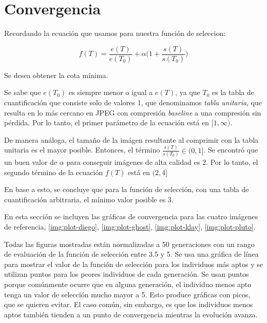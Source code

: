 \section{Convergencia}

Recordando la ecuación que usamos para nuestra función de seleccion:

\begin{equation}
f(T) = \frac{e(T)}{e(T_0)} + \alpha \Big(1 + \frac{s(T)}{s(T_0)}\Big)
\end{equation}\label{eq:fitness-repeated}

Se desea obtener la cota mínima.

Se sabe que $e(T_0)$ es siempre menor o igual a $e(T)$, ya que $T_0$ es la
tabla de cuantificación que consiste solo de valores 1, que denominamos
\emph{tabla unitaria}, que resulta en lo más cercano en JPEG con compresión
\emph{baseline} a una compresión sin pérdida. Por lo tanto, el primer parámetro
de la ecuación está en $[1, \infty)$.

De manera análoga, el tamaño de la imágen resultante al comprimir con la tabla
unitaria es el mayor posible. Entonces, el término $\frac{s(T)}{s(T_0)} \in (0,
1]$. Se encontró que un buen valor de $\alpha$ para conseguir imágenes de alta
calidad es 2. Por lo tanto, el segundo término de la ecuación $f(T)$ está en
$(2, 4]$

En base a esto, se concluye que para la función de selección, con una tabla de
cuantificación arbitraria, el mínimo valor posible es 3.

En esta sección se incluyen las gráficas de convergencia para las cuatro
imágenes de referencia, \ref{img:plot-diego}, \ref{img:plot-ghost},
\ref{img:plot-klay}, \ref{img:plot-pluto}.

Todas las figuras mostradas están normalizadas a 50 generaciones con un rango
de evaluación de la función de selección entre 3.5 y 5. Se usa una gráfica de
línea para mostrar el valor de la función de selección para los individuos más
aptos y se utilizan puntos para los peores individuos de cada generación. Se
usan puntos porque comúnmente ocurre que en alguna generación, el individuo
menos apto tenga un valor de selección mucho mayor a 5. Esto produce gráficas
con picos, que se quieren evitar. El caso común, sin embargo, es que los
individuos menos aptos también tienden a un punto de convergencia mientras la
evolución avanza.

